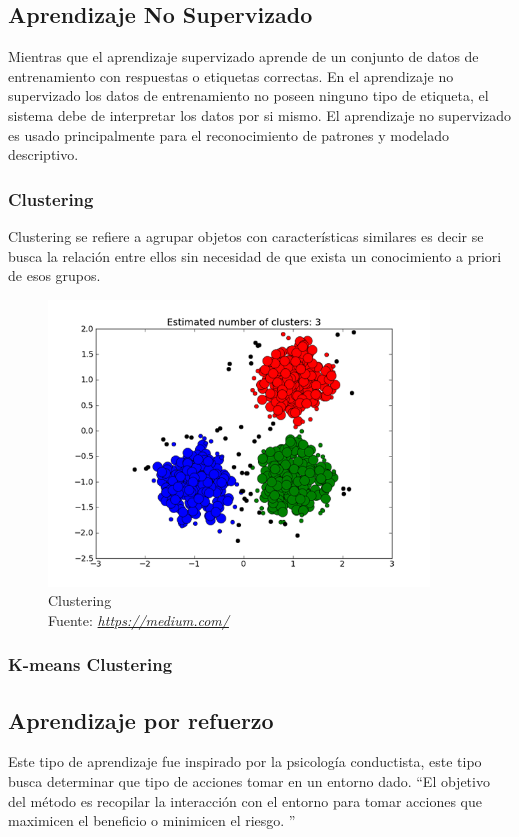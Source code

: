 \subsection{Aprendizaje No Supervizado}
Mientras que el aprendizaje supervizado aprende  de un conjunto de datos de entrenamiento con respuestas o etiquetas correctas. En el aprendizaje no supervizado los datos de entrenamiento no poseen ninguno tipo de etiqueta, el sistema debe de interpretar los datos por si mismo.
El aprendizaje no supervizado es usado principalmente para el reconocimiento de patrones y modelado descriptivo.
\subsubsection*{Clustering}
Clustering se refiere a agrupar objetos con características similares es decir se busca la relación entre ellos sin necesidad de que exista un conocimiento a priori de esos grupos.
\begin{figure}[H]
	\centering
	\includegraphics[width=0.9\textwidth]{Figures/clustering.png}
	\caption{Clustering \\ Fuente:  \href{https://medium.com/deep-math-machine-learning-ai/different-types-of-machine-learning-and-their-types-34760b9128a2}{\textit{https://medium.com/}}}
	\label{Clustering}
\end{figure} 
\subsubsection*{K-means Clustering}

\subsection{Aprendizaje por refuerzo}
Este tipo de aprendizaje fue inspirado por la psicología conductista, este tipo busca determinar que tipo de acciones tomar en un entorno dado. \textquotedblleft El objetivo del método es recopilar la interacción con el entorno para tomar acciones que maximicen el beneficio o minimicen el riesgo. \textquotedblright \cite{WEBSITE:1}

